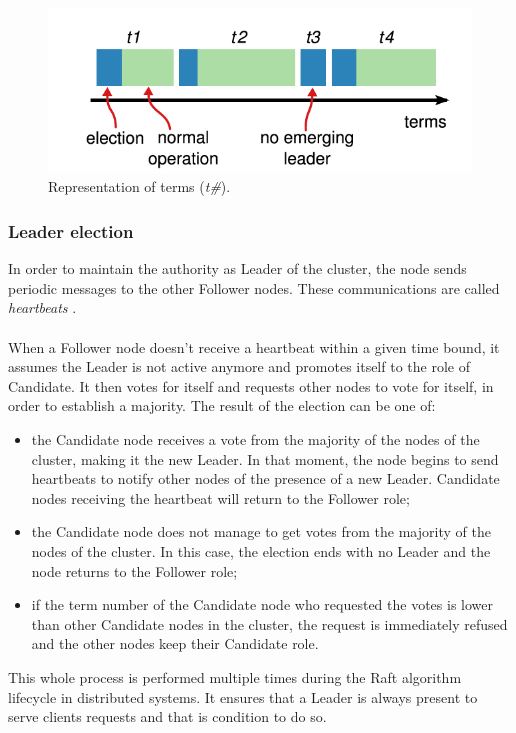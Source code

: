 \begin{figure}[h]
	\centering
	\includegraphics[width=0.7\linewidth]{"immagini/Technologies/image2.png"}
	\caption{Representation of terms (\textit{t\#}).}
	\label{fig:terms}
\end{figure}
\subsubsection{Leader election}
In order to maintain the authority as Leader of the cluster, the node sends periodic messages to the other Follower nodes. These communications are called \textit{heartbeats} \cite{site:raft-consensus-algorithm}. \\ \\
When a Follower node doesn't receive a heartbeat within a given time bound, it assumes the Leader is not active anymore and promotes itself to the role of Candidate. It then votes for itself and requests other nodes to vote for itself, in order to establish a majority. The result of the election can be one of:
\begin{itemize}
	\item the Candidate node receives a vote from the majority of the nodes of the cluster, making it the new Leader. In that moment, the node begins to send heartbeats to notify other nodes of the presence of a new Leader. Candidate nodes receiving the heartbeat will return to the Follower role;
	\item the Candidate node does not manage to get votes from the majority of the nodes of the cluster. In this case, the election ends with no Leader and the node returns to the Follower role;
	\item if the term number of the Candidate node who requested the votes is lower than other Candidate nodes in the cluster, the request is immediately refused and the other nodes keep their Candidate role.
\end{itemize}
This whole process is performed multiple times during the Raft algorithm lifecycle in distributed systems. It ensures that a Leader is always present to serve clients requests and that is condition to do so.

